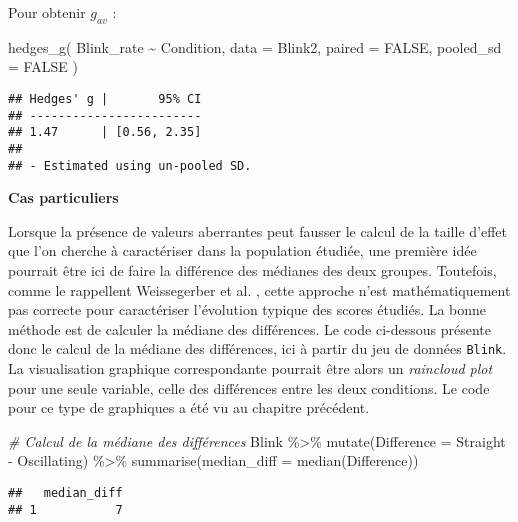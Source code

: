 \documentclass[
]{book}
\newenvironment{Shaded}{\begin{snugshade}}{\end{snugshade}}
\newcommand{\AttributeTok}[1]{\textcolor[rgb]{0.77,0.63,0.00}{#1}}
\newcommand{\CommentTok}[1]{\textcolor[rgb]{0.56,0.35,0.01}{\textit{#1}}}
\newcommand{\ConstantTok}[1]{\textcolor[rgb]{0.00,0.00,0.00}{#1}}
\newcommand{\FunctionTok}[1]{\textcolor[rgb]{0.00,0.00,0.00}{#1}}
\newcommand{\NormalTok}[1]{#1}
\newcommand{\SpecialCharTok}[1]{\textcolor[rgb]{0.00,0.00,0.00}{#1}}
\begin{document}
Pour obtenir \(g_{av}\) :

\begin{Shaded}
\begin{Highlighting}[]
\FunctionTok{hedges\_g}\NormalTok{(}
\NormalTok{  Blink\_rate }\SpecialCharTok{\textasciitilde{}}\NormalTok{ Condition,}
  \AttributeTok{data =}\NormalTok{ Blink2, }
  \AttributeTok{paired =} \ConstantTok{FALSE}\NormalTok{, }
  \AttributeTok{pooled\_sd =} \ConstantTok{FALSE}
\NormalTok{  )}
\end{Highlighting}
\end{Shaded}

\begin{verbatim}
## Hedges' g |       95% CI
## ------------------------
## 1.47      | [0.56, 2.35]
## 
## - Estimated using un-pooled SD.
\end{verbatim}

\textbf{Cas particuliers}

Lorsque la présence de valeurs aberrantes peut fausser le calcul de la taille d'effet que l'on cherche à caractériser dans la population étudiée, une première idée pourrait être ici de faire la différence des médianes des deux groupes. Toutefois, comme le rappellent Weissegerber et al. \autocite*{weissgerberBarLineGraphs2015}, cette approche n'est mathématiquement pas correcte pour caractériser l'évolution typique des scores étudiés. La bonne méthode est de calculer la médiane des différences. Le code ci-dessous présente donc le calcul de la médiane des différences, ici à partir du jeu de données \texttt{Blink}. La visualisation graphique correspondante pourrait être alors un \emph{raincloud plot} pour une seule variable, celle des différences entre les deux conditions. Le code pour ce type de graphiques a été vu au chapitre précédent.

\begin{Shaded}
\begin{Highlighting}[]
\CommentTok{\# Calcul de la médiane des différences}
\NormalTok{ Blink }\SpecialCharTok{\%\textgreater{}\%}
  \FunctionTok{mutate}\NormalTok{(}\AttributeTok{Difference =}\NormalTok{ Straight }\SpecialCharTok{{-}}\NormalTok{ Oscillating) }\SpecialCharTok{\%\textgreater{}\%}
  \FunctionTok{summarise}\NormalTok{(}\AttributeTok{median\_diff =} \FunctionTok{median}\NormalTok{(Difference))}
\end{Highlighting}
\end{Shaded}

\begin{verbatim}
##   median_diff
## 1           7
\end{verbatim}
\end{document}
